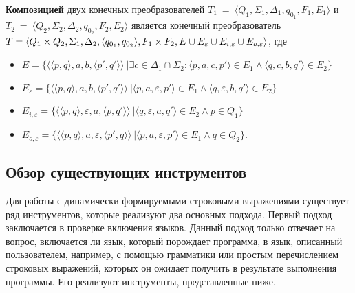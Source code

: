 \documentclass{matmex-diploma}
\begin{document}
\textbf{Композицией} двух конечных преобразователей $T_1~=~\langle Q_1, \Sigma_1, \Delta_1, q_{0_{1}}, F_1, E_1 \rangle$ и $T_2~=~\langle Q_2, \Sigma_2, \Delta_2, q_{0_{2}}, F_2, E_2 \rangle$ является конечный преобразователь  $T =\langle Q_1  \times Q_2, \Sigma_1, \Delta_2, \\ \langle q_{0_{1}}, q_{0_{2}} \rangle, F_1 \times F_2, E \cup E_{\varepsilon} \cup E_{i,\varepsilon} \cup E_{o,\varepsilon} \rangle$, где 

\begin{itemize}
\item $E = \{ \langle \langle p, q \rangle, a, b, \langle p', q' \rangle \rangle\ | \exists c \in \Delta_1 \cap \Sigma_2 : \langle p, a, c, p' \rangle \in E_1 \wedge \langle q, c, b, q' \rangle \in E_2\}$
\item $E_{\varepsilon} = \{ \langle \langle p, q \rangle, a, b, \langle p', q' \rangle \rangle\ | \langle p, a, {\varepsilon}, p' \rangle \in E_1 \wedge \langle q, {\varepsilon}, b, q' \rangle \in E_2\}$
\item $E_{i, \varepsilon} = \{ \langle \langle p, q \rangle, {\varepsilon}, a, \langle p, q' \rangle \rangle\ | \langle q, {\varepsilon}, a, q' \rangle \in E_2 \wedge p \in Q_1 \} $
\item $E_{o, \varepsilon} = \{ \langle \langle p, q \rangle,  a, {\varepsilon}, \langle p', q \rangle \rangle\ | \langle p, a, {\varepsilon}, p' \rangle \in E_1 \wedge q \in Q_2 \}. $
\end{itemize}


\subsection{Обзор существующих инструментов}

Для работы с динамически формируемыми строковыми выражениями существует ряд инструментов, которые реализуют два основных подхода. Первый подход заключается в проверке включения языков. Данный подход только отвечает на вопрос, включается ли язык, который порождает программа, в язык, описанный пользователем, например, с помощью грамматики или простым перечислением строковых выражений, которых он ожидает получить в результате выполнения программы. Его реализуют инструменты, представленные ниже.
\end{document}
